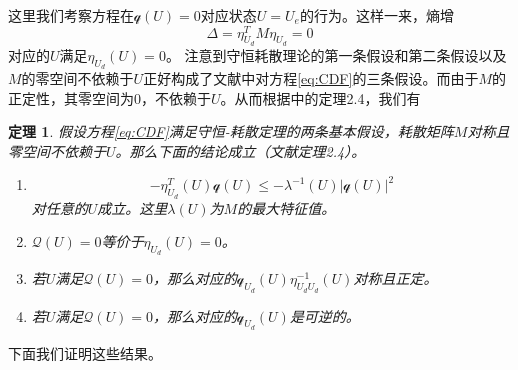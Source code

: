 \documentclass{article}
\newtheorem{theorem}{定理}
\begin{document}
	这里我们考察方程在$\mathcal{q}(U)=0$对应状态$U=U_e$的行为。这样一来，熵增
	\begin{equation*}
		\Delta = \eta_{U_d}^T M \eta_{U_d} = 0
	\end{equation*}
	对应的$U$满足$\eta_{U_d}(U) = 0$。
	注意到守恒耗散理论的第一条假设和第二条假设以及$M$的零空间不依赖于$U$正好构成了文献\cite{}中对方程\eqref{eq:CDF}的三条假设。而由于$M$的正定性，其零空间为0，不依赖于$U$。从而根据\cite{}中的定理2.4，我们有
	\begin{theorem}
		假设方程\eqref{eq:CDF}满足守恒-耗散定理的两条基本假设，耗散矩阵$M$对称且零空间不依赖于$U$。那么下面的结论成立（文献\cite{}定理2.4）。
		\begin{enumerate}
			\item $$-\eta_{U_d}^T (U) \mathcal{q}(U) \le -\lambda^{-1}(U) |\mathcal{q}(U)|^2$$对任意的$U$成立。这里$\lambda(U)$为$M$的最大特征值。
			\item $\mathcal{Q} (U) = 0$等价于$\eta_{U_d} (U) = 0$。
			\item 若$U$满足$\mathcal{Q}(U)=0$，那么对应的$\mathcal{q}_{U_d}(U) \eta_{U_d U_d}^{-1}(U)$对称且正定。
			\item 若$U$满足$\mathcal{Q}(U)=0$，那么对应的$\mathcal{q}_{U_d}(U)$是可逆的。
		\end{enumerate}
	\end{theorem}
	下面我们证明这些结果。
\end{document}
